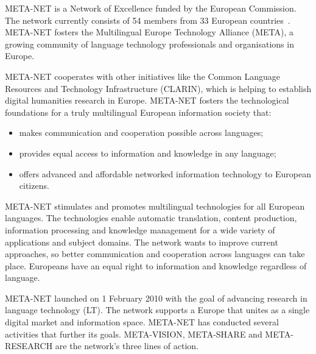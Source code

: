 \cleardoublepage
\begin{multicols}{2}

META-NET is a Network of Excellence funded by the European
Commission. The network currently consists of 54 members from 33
European countries~\cite{rehm2011}. META-NET fosters the Multilingual Europe
Technology Alliance (META), a growing community of language technology
professionals and organisations in Europe.


META-NET cooperates with other initiatives like the Common Language
Resources and Technology Infrastructure (CLARIN), which is helping to
establish digital humanities research in Europe. META-NET fosters the
technological foundations for a truly multilingual European
information society that:
\begin{itemize}
\item makes communication and cooperation possible across languages;

\item provides equal access to information and knowledge in any language;

\item offers advanced and affordable networked information technology to European
    citizens.
\end{itemize}
META-NET stimulates and promotes multilingual technologies for all
European languages. The technologies enable automatic translation,
content production, information processing and knowledge management
for a wide variety of applications and subject domains. The network
wants to improve current approaches, so better communication and
cooperation across languages can take place. Europeans have an equal
right to information and knowledge regardless of language.

META-NET launched on 1 February 2010 with the goal of advancing
research in language technology (LT). The network supports a Europe
that unites as a single digital market and information space. META-NET
has conducted several activities that further its goals. META-VISION,
META-SHARE and META-RESEARCH are the network’s three lines of action.



\end{multicols}
